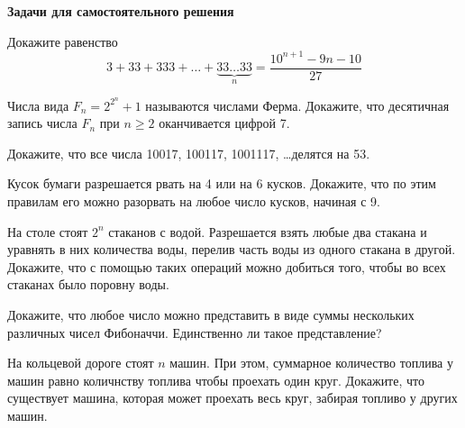 {\bf Задачи для самостоятельного решения}
\begin{problems}



\item
Докажите равенство $$3 + 33 + 333 + \ldots + \underbrace{33 \ldots
33}_n = \dfrac{10^{n+1} - 9n - 10}{27}$$

\item Числа вида $F_n = 2^{2^n} + 1$ называются числами Ферма. Докажите, что десятичная запись числа $F_n$ при $n \geqslant 2$ оканчивается цифрой 7.

\item Докажите, что все числа 10017, 100117, 1001117, \ldots делятся на 53.
\item Кусок бумаги разрешается рвать на 4 или на 6 кусков. Докажите, что по этим правилам его можно разорвать на любое число кусков, начиная с 9.
\item На столе стоят $2^n$ стаканов с водой. Разрешается взять любые два стакана и уравнять в них количества воды, перелив часть воды из одного стакана в другой. Докажите, что с помощью таких операций можно добиться того, чтобы во всех стаканах было поровну воды. 
\item Докажите, что любое число можно представить в виде суммы нескольких различных чисел Фибоначчи. Единственно ли такое представление?
\item На кольцевой дороге стоят $n$ машин. При этом, суммарное количество топлива у машин  равно количнству топлива чтобы проехать один круг. Докажите, что существует машина, которая может проехать весь круг, забирая топливо у других машин.


\end{problems}
